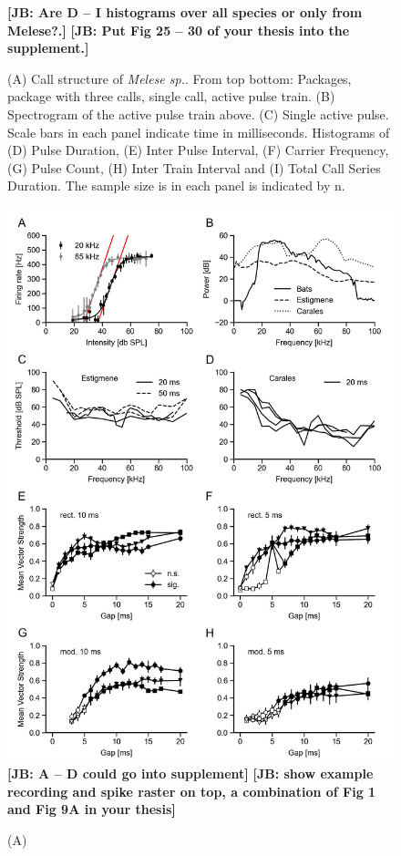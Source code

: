 \documentclass[12pt,a4paper]{article}
\newcommand{\species}[1]{\textit{#1}}
\newcommand{\note}[2][]{\textbf{[#1: #2]}}
\newcommand{\notejb}[1]{\note[JB]{#1}}
\begin{document}
\begin{figure}[h!]
        \notejb{Are D -- I histograms over all species or only from Melese?.}
        \notejb{Put Fig 25 -- 30 of your thesis into the supplement.}
	\caption{\label{fig:01}(A) Call structure of \species{Melese sp.}. From top bottom: Packages, package with three calls, single call, active pulse train. (B) Spectrogram of the active pulse train above. (C) Single active pulse. Scale bars in each panel indicate time in milliseconds.
    Histograms of (D) Pulse Duration, (E) Inter Pulse Interval, (F) Carrier Frequency, (G) Pulse Count, (H) Inter Train Interval and (I) Total Call Series Duration. The sample size is in each panel is indicated by n.}
\end{figure}

\begin{figure}[h!]
	\centering
	\includegraphics{figures/Fig_02.jpeg}
        \notejb{A -- D could go into supplement}
        \notejb{show example recording and spike raster on top, a combination of Fig 1 and Fig 9A in your thesis}
	\caption{\label{fig:02}(A)}
\end{figure}
\end{document}
